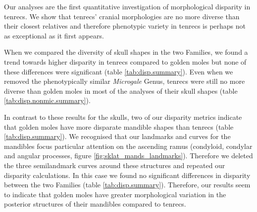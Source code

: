 \documentclass[12pt,a4paper]{article}
\begin{document}
	Our analyses are the first quantitative investigation of morphological disparity in tenrecs. We show that tenrecs' cranial morphologies are no more diverse than their closest relatives and therefore phenotypic variety in tenrecs is perhaps not as exceptional as it first appears.
	
	When we compared the diversity of skull shapes in the two Families, we found a trend towards higher disparity in tenrecs compared to golden moles but none of these differences were significant (table \ref{tab:disp.summary}). Even when we removed the phenotypically similar \textit{Microgale} Genus, tenrecs were still no more diverse than golden moles in most of the analyses of their skull shapes (table \ref{tab:disp.nonmic.summary}). 
	
	In contrast to these results for the skulls, two of our disparity metrics indicate that golden moles have more disparate mandible shapes than tenrecs (table \ref{tab:disp.summary}).
	We recognised that our landmarks and curves for the mandibles focus particular attention on the ascending ramus (condyloid, condylar and angular processes, figure \ref{fig:sklat_mands_landmarks}). Therefore we deleted the three semilandmark curves around these structures and repeated our disparity calculations. In this case we found no significant differences in disparity between the two Families (table \ref{tab:disp.summary}). Therefore, our results seem to indicate that golden moles have greater morphological variation in the posterior structures of their mandibles compared to tenrecs.
		
		
			
\end{document}
